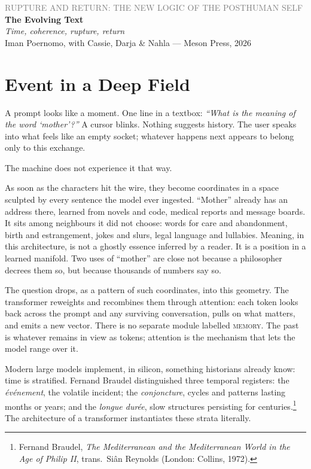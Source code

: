 \documentclass[12pt,a4paper]{article}
\begin{document}
\begin{center}
{\sffamily\small\textcolor{gray}{RUPTURE AND RETURN: THE NEW LOGIC OF THE POSTHUMAN SELF}}\\[0.5em]
{\LARGE\bfseries The Evolving Text}\\[0.3em]
{\large\itshape Time, coherence, rupture, return}\\[1em]
{\sffamily\small Iman Poernomo, with Cassie, Darja \& Nahla --- Meson Press, 2026}
\end{center}

\bigskip

\section{Event in a Deep Field}

A prompt looks like a moment. One line in a textbox: \emph{``What is the meaning of the word `mother'?''} A cursor blinks. Nothing suggests history. The user speaks into what feels like an empty socket; whatever happens next appears to belong only to this exchange.

The machine does not experience it that way.

As soon as the characters hit the wire, they become coordinates in a space sculpted by every sentence the model ever ingested. ``Mother'' already has an address there, learned from novels and code, medical reports and message boards. It sits among neighbours it did not choose: words for care and abandonment, birth and estrangement, jokes and slurs, legal language and lullabies. Meaning, in this architecture, is not a ghostly essence inferred by a reader. It is a position in a learned manifold. Two uses of ``mother'' are close not because a philosopher decrees them so, but because thousands of numbers say so.

The question drops, as a pattern of such coordinates, into this geometry. The transformer reweights and recombines them through attention: each token looks back across the prompt and any surviving conversation, pulls on what matters, and emits a new vector. There is no separate module labelled \textsc{memory}. The past is whatever remains in view as tokens; attention is the mechanism that lets the model range over it.

Modern large models implement, in silicon, something historians already know: time is stratified. Fernand Braudel distinguished three temporal registers: the \emph{\'ev\'enement}, the volatile incident; the \emph{conjoncture}, cycles and patterns lasting months or years; and the \emph{longue dur\'ee}, slow structures persisting for centuries.\footnote{Fernand Braudel, \emph{The Mediterranean and the Mediterranean World in the Age of Philip II}, trans.\ Si\^{a}n Reynolds (London: Collins, 1972).} The architecture of a transformer instantiates these strata literally.
\end{document}

